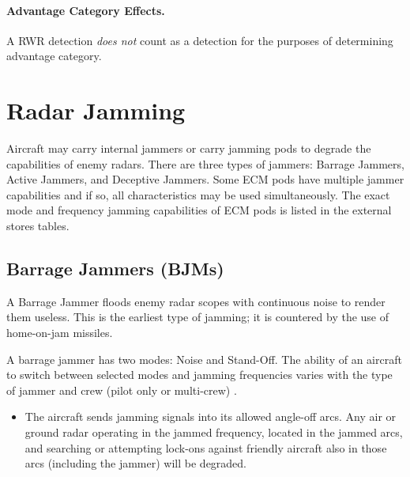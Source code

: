 \begin{advancedrules}
{\paragraph{Advantage Category Effects.} A RWR detection \emph{does not} count as a detection for the purposes of determining advantage category.
}

\section{Radar Jamming}
\label{rule:radar-jamming}

Aircraft may carry internal jammers or carry jamming pods to degrade the capabilities of enemy radars. There are three types of jammers: Barrage Jammers, Active Jammers, and Deceptive Jammers. Some ECM pods have multiple jammer capabilities and if so, all characteristics may be used simultaneously. The exact mode and frequency jamming capabilities of ECM pods is listed in the external stores tables. 


\subsection{Barrage Jammers (BJMs)}
\label{rule:home-on-jam-seeker}


A Barrage Jammer floods enemy radar scopes with continuous noise to render them useless. This is the earliest type of jamming; it is countered by the use of home-on-jam missiles.

A barrage jammer has two modes: Noise and Stand-Off. The ability of an aircraft to switch between selected modes and jamming frequencies varies with the type of jammer and crew (pilot only or multi-crew) . 

\begin{itemize}

    \item {} The aircraft sends jamming signals into its allowed angle-off arcs. Any air or ground radar operating in the jammed frequency, located in the jammed arcs, and searching or attempting lock-ons against friendly aircraft also in those arcs (including the jammer) will be degraded.


\end{itemize}
\end{advancedrules}
